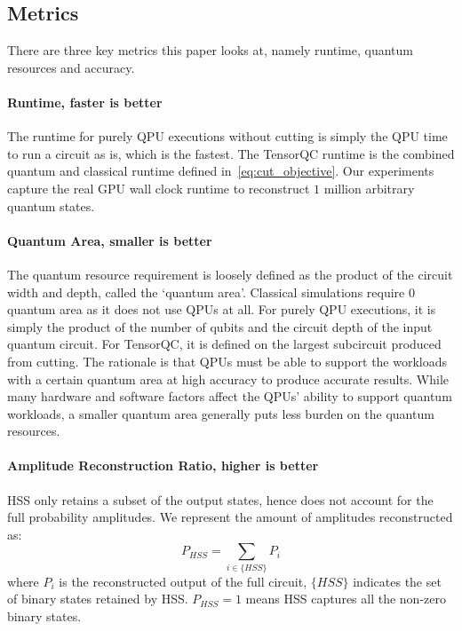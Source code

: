 \subsection{Metrics}
There are three key metrics this paper looks at, namely runtime, quantum resources and accuracy.

\paragraph{Runtime, faster is better}
The runtime for purely QPU executions without cutting is simply the QPU time to run a circuit as is,
which is the fastest.
The TensorQC runtime is the combined quantum and classical runtime defined in~\ref{eq:cut_objective}.
Our experiments capture the real GPU wall clock runtime to reconstruct $1$ million arbitrary quantum states.

\paragraph{Quantum Area, smaller is better}
The quantum resource requirement is loosely defined as the product of the circuit width and depth,
called the `quantum area'.
Classical simulations require $0$ quantum area as it does not use QPUs at all.
For purely QPU executions, it is simply the product of the number of qubits and the circuit depth of the input quantum circuit.
For TensorQC, it is defined on the largest subcircuit produced from cutting.
The rationale is that QPUs must be able to support the workloads with a certain quantum area at high accuracy to produce accurate results.
While many hardware and software factors affect the QPUs' ability to support quantum workloads,
a smaller quantum area generally puts less burden on the quantum resources.

\paragraph{Amplitude Reconstruction Ratio, higher is better}
HSS only retains a subset of the output states,
hence does not account for the full probability amplitudes.
We represent the amount of amplitudes reconstructed as:
\begin{equation}
    P_{HSS}=\sum_{i\in \{HSS\}}P_i
\end{equation}
where $P_i$ is the reconstructed output of the full circuit,
$\{HSS\}$ indicates the set of binary states retained by HSS.
$P_{HSS}=1$ means HSS captures all the non-zero binary states.

